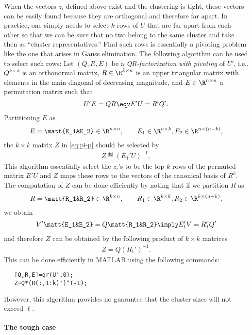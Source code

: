 \documentclass[10pt]{article}
\begin{document}
When the vectors $z_i$ defined above exist and the clustering is
tight, these vectors can be easily found because they are orthogonal
and therefore far apart. In practice, one simply needs to select
$k$-rows of $U$ that are far apart from each other so that we can be
sure that no two belong to the same cluster and take then as ``cluster
representatives.''  Find such rows is essentially a pivoting problem
like the one that arises in Gauss elimination. The following algorithm
can be used to select such rows: Let $(Q,R,E)$ be a
\emph{QR-factorization with pivoting} of $U'$, i.e., $Q^{k\times k}$ is an
orthonormal matrix, $R\in\R^{k\times n}$ is an upper triangular matrix with
elements in the main diagonal of decreasing magnitude, and $E\in\R^{n\times
  n}$ a permutation matrix such that
\begin{align*}
  U' E = Q R \eqv
  E' U = R' Q'.
\end{align*}
Partitioning $E$ as 
\begin{align*}
  E=\matt{E_1&E_2}\in\R^{n\times n}, \qquad E_1\in\R^{n\times k}, E_2\in\R^{n\times(n-k)},
\end{align*}
the $k\times k$ matrix $Z$ in \eqref{eq:pi-p} should be selected by
\begin{align*}
  Z\eqdef (E_1'U)^{-1},
\end{align*}
This algorithm essentially select the $z_i$'s to be the top $k$ rows
of the permuted matrix $E' U$ and $Z$ maps these rows to the vectors
of the canonical basis of $R^k$. The computation of $Z$ can be done
efficiently by noting that if we partition $R$ as
\begin{align*}
  R=\matt{R_1&R_2}\in\R^{k\times n}, \qquad R_1\in\R^{k\times k}, R_2\in\R^{k\times(n-k)},
\end{align*}
we obtain
\begin{align*}
  V'\matt{E_1&E_2}=Q \matt{R_1&R_2}
  \imply
  E_1'V=R_1' Q'
\end{align*}
and therefore $Z$ can be obtained by the following product of $k\times k$ matrices
\begin{align*}
  Z=Q (R_1')^{-1}.
\end{align*}
This can be done efficiently in MATLAB using the following commands:
\begin{verbatim}
   [Q,R,E]=qr(U',0);
   Z=Q*(R(:,1:k)')^(-1);
\end{verbatim}
However, this algorithm provides no guarantee that the cluster sizes
will not exceed $\ell$.

\paragraph{The tough case}
\end{document}
